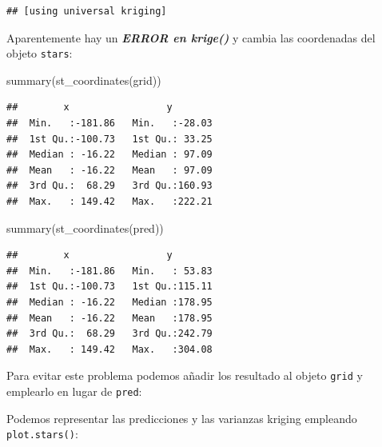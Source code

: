 \documentclass[
  spanish,
]{book}
\newenvironment{Shaded}{\begin{snugshade}}{\end{snugshade}}
\newcommand{\FunctionTok}[1]{\textcolor[rgb]{0.00,0.00,0.00}{#1}}
\newcommand{\NormalTok}[1]{#1}
\newcommand{\OtherTok}[1]{\textcolor[rgb]{0.56,0.35,0.01}{#1}}
\newcommand{\SpecialCharTok}[1]{\textcolor[rgb]{0.00,0.00,0.00}{#1}}
\theoremstyle{break}
\theoremstyle{definition}
\theoremstyle{definition}
\theoremstyle{definition}
\theoremstyle{definition}
\theoremstyle{remark}
\begin{document}
\begin{verbatim}
## [using universal kriging]
\end{verbatim}

Aparentemente hay un \textbf{\emph{ERROR en krige()}} y cambia las coordenadas del objeto \texttt{stars}:

\begin{Shaded}
\begin{Highlighting}[]
\FunctionTok{summary}\NormalTok{(}\FunctionTok{st\_coordinates}\NormalTok{(grid))}
\end{Highlighting}
\end{Shaded}

\begin{verbatim}
##        x                 y         
##  Min.   :-181.86   Min.   :-28.03  
##  1st Qu.:-100.73   1st Qu.: 33.25  
##  Median : -16.22   Median : 97.09  
##  Mean   : -16.22   Mean   : 97.09  
##  3rd Qu.:  68.29   3rd Qu.:160.93  
##  Max.   : 149.42   Max.   :222.21
\end{verbatim}

\begin{Shaded}
\begin{Highlighting}[]
\FunctionTok{summary}\NormalTok{(}\FunctionTok{st\_coordinates}\NormalTok{(pred))}
\end{Highlighting}
\end{Shaded}

\begin{verbatim}
##        x                 y         
##  Min.   :-181.86   Min.   : 53.83  
##  1st Qu.:-100.73   1st Qu.:115.11  
##  Median : -16.22   Median :178.95  
##  Mean   : -16.22   Mean   :178.95  
##  3rd Qu.:  68.29   3rd Qu.:242.79  
##  Max.   : 149.42   Max.   :304.08
\end{verbatim}

Para evitar este problema podemos añadir los resultado al objeto \texttt{grid} y emplearlo en lugar de \texttt{pred}:

\begin{Shaded}
\end{Shaded}

Podemos representar las predicciones y las varianzas kriging empleando \texttt{plot.stars()}:
\end{document}
